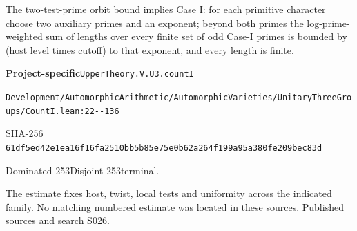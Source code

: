 
\begin{formalstatement}[D532]\label{decomp:D532}
The two-test-prime orbit bound implies Case I: for each primitive character choose two auxiliary primes and an exponent; beyond both primes the log-prime-weighted sum of lengths over every finite set of odd Case-I primes is bounded by (host level times cutoff) to that exponent, and every length is finite.
\end{formalstatement}
{\small\raggedright\noindent\textsf{\bfseries Project-specific}\quad \nolinkurl{UpperTheory.V.U3.countI}\par\noindent \nolinkurl{Development/AutomorphicArithmetic/AutomorphicVarieties/UnitaryThreeGroups/CountI.lean:22--136}\par\noindent SHA-256 \nolinkurl{61df5ed42e1ea16f16fa2510bb5b85e75e0b62a264f199a95a380fe209bec83d}\par\noindent Dominated 253\quad Disjoint 253\quad terminal.\par}
The estimate fixes host, twist, local tests and uniformity across the indicated family. No matching numbered estimate was located in these sources.
\hyperref[lit:S026]{Published sources and search S026}.
